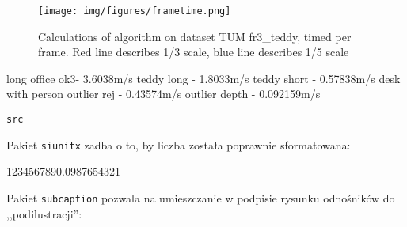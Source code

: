 \begin{figure}[ht]
	\centering\texttt{[image: img/figures/frametime.png]}
	\caption{ Calculations of algorithm on dataset TUM fr3\_teddy, timed per frame. Red line describes 1/3 scale, blue line describes 1/5 scale }
	\label{fig:timing}
\end{figure}


long office ok3- 3.6038m/s
teddy long - 1.8033m/s
teddy short - 0.57838m/s
desk with person outlier rej - 0.43574m/s
				 outlier depth - 0.092159m/s







\begin{lstlisting}
src
\end{lstlisting}

Pakiet \texttt{siunitx} zadba o to, by liczba została poprawnie sformatowana: \\
\begin{center}
	\num{1234567890.0987654321}
\end{center}


Pakiet \texttt{subcaption} pozwala na umieszczanie w podpisie rysunku odnośników do ,,podilustracji'': \\

